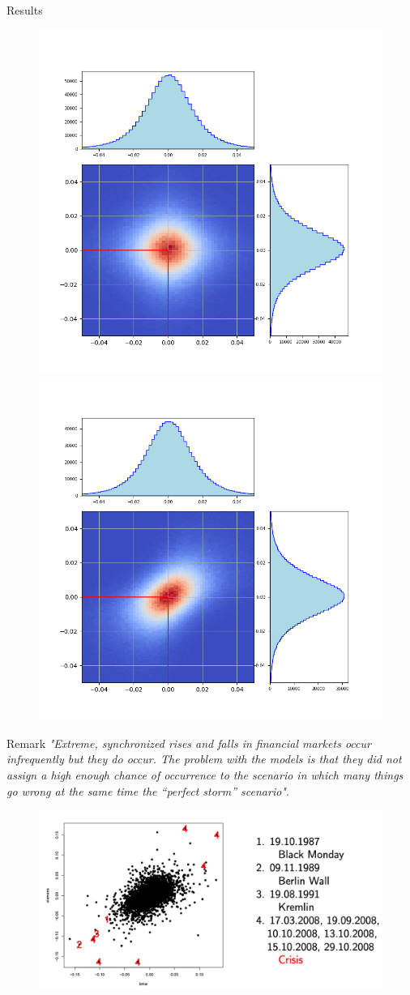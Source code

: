 \documentclass{beamer}
\begin{document}
\begin{frame}[fragile]{Results}
  \begin{figure}[h]
    \begin{center}
      \includegraphics[width=0.45\linewidth]{bmw_siemens_corr} \quad
      \includegraphics[width=0.45\linewidth]{bmw_siemens_uncorr}
    \end{center}
  \end{figure}
\end{frame}

\begin{frame}{Remark}
  \emph{"Extreme, synchronized rises and falls in financial markets occur
infrequently but they do occur. The problem with the models is that
they did not assign a high enough chance of occurrence to the scenario
in which many things go wrong at the same time the “perfect storm” scenario"}.
  \begin{figure}[h]
    \begin{center}
      \includegraphics[width=0.7\linewidth]{crisis}
    \end{center}
  \end{figure}
\end{frame}
\end{document}
